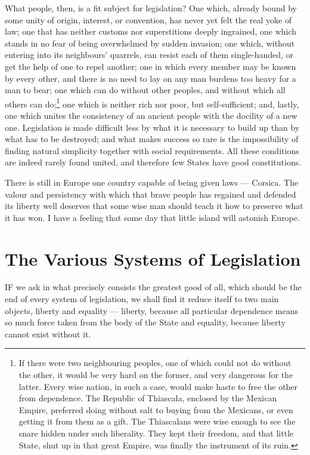 \documentclass[12pt]{report}
\begin{document}
What people, then, is a fit subject for legislation? One which, already bound by some unity of origin, interest, or convention, has never yet felt the real yoke of law; one that has neither customs nor superstitions deeply ingrained, one which stands in no fear of being overwhelmed by sudden invasion; one which, without entering into its neighbours' quarrels, can resist each of them single-handed, or get the help of one to repel another; one in which every member may be known by every other, and there is no need to lay on any man burdens too heavy for a man to bear; one which can do without other peoples, and without which all others can do;\footnote{ If there were two neighbouring peoples, one of which could not do without the other, it would be very hard on the former, and very dangerous for the latter. Every wise nation, in such a case, would make haste to free the other from dependence. The Republic of Thiascala, enclosed by the Mexican Empire, preferred doing without salt to buying from the Mexicans, or even getting it from them as a gift. The Thiascalans were wise enough to see the snare hidden under such liberality. They kept their freedom, and that little State, shut up in that great Empire, was finally the instrument of its ruin.} one which is neither rich nor poor, but self-sufficient; and, lastly, one which unites the consistency of an ancient people with the docility of a new one. Legislation is made difficult less by what it is necessary to build up than by what has to be destroyed; and what makes success so rare is the impossibility of finding natural simplicity together with social requirements. All these conditions are indeed rarely found united, and therefore few States have good constitutions.

There is still in Europe one country capable of being given laws — Corsica. The valour and persistency with which that brave people has regained and defended its liberty well deserves that some wise man should teach it how to preserve what it has won. I have a feeling that some day that little island will astonish Europe.

\section{The Various Systems of Legislation}
IF we ask in what precisely consists the greatest good of all, which should be the end of every system of legislation, we shall find it reduce itself to two main objects, liberty and equality — liberty, because all particular dependence means so much force taken from the body of the State and equality, because liberty cannot exist without it.
\end{document}
